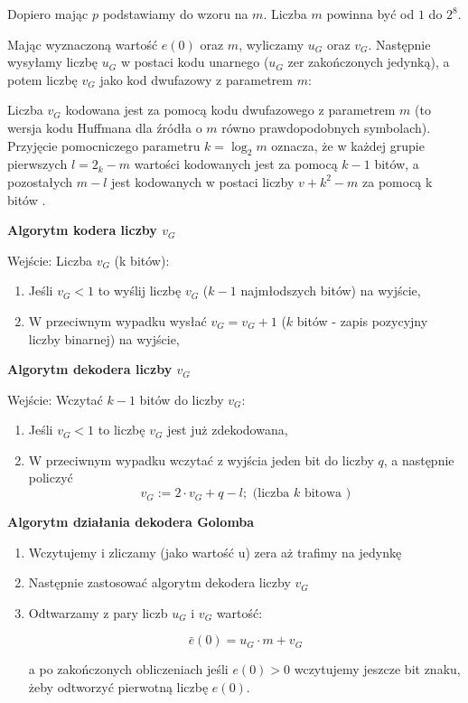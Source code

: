 \documentclass{article}
\begin{document}
Dopiero mając $p$ podstawiamy do wzoru na $m$. Liczba $m$ powinna być od $1$ do $2^8$.

Mając wyznaczoną wartość $e(0)$ oraz $m$, wyliczamy $u_G$ oraz $v_G$. Następnie wysyłamy liczbę $u_G$ w postaci kodu unarnego ($u_G$ zer zakończonych jedynką), a potem liczbę $v_G$ jako kod dwufazowy z parametrem $m$:

Liczba $v_G$ kodowana jest za pomocą kodu dwufazowego z parametrem $m$ (to wersja kodu Huffmana dla źródła o $m$ równo prawdopodobnych symbolach). Przyjęcie pomocniczego parametru $k = \log_2 m$ oznacza, że w każdej grupie pierwszych $l = 2_k - m$ wartości kodowanych jest za pomocą $k - 1$ bitów, a pozostałych $m-l$ jest kodowanych w postaci liczby $v + k^2 - m$ za pomocą k bitów \cite{golomb}.

\textbf{Algorytm kodera liczby $v_G$}

Wejście: Liczba $v_G$ (k bitów):

\begin{enumerate}
  \item Jeśli $v_G < 1$ to wyślij liczbę $v_G$ ($k-1$ najmłodszych bitów) na wyjście,
  \item W przeciwnym wypadku wysłać $v_G = v_G + 1$ ($k$ bitów - zapis pozycyjny liczby binarnej) na wyjście,
\end{enumerate}

\textbf{Algorytm dekodera liczby $v_G$}

Wejście: Wczytać $k - 1$ bitów do liczby $v_G$:

\begin{enumerate}
  \item Jeśli $v_G < 1$ to liczbę $v_G$ jest już zdekodowana,
  \item W przeciwnym wypadku wczytać z wyjścia jeden bit do liczby $q$, a następnie policzyć 
  \begin{equation}
  v_{G}:=2 \cdot v_{G}+q-l ; \text { (liczba } k \text { bitowa })
  \end{equation}
\end{enumerate}

\textbf{Algorytm działania dekodera Golomba}

\begin{enumerate}
  \item Wczytujemy i zliczamy (jako wartość u) zera aż trafimy na jedynkę
  \item Następnie zastosować algorytm dekodera liczby $v_G$
  \item Odtwarzamy z pary liczb $u_G$ i $v_G$ wartość:
  
  \begin{equation}
  \bar{e}(0)=u_{G} \cdot m+v_{G}
  \end{equation}
  
  a po zakończonych obliczeniach jeśli $e(0) > 0$ wczytujemy jeszcze bit znaku, żeby odtworzyć pierwotną liczbę $e(0)$.	
  
\end{enumerate}
\end{document}
